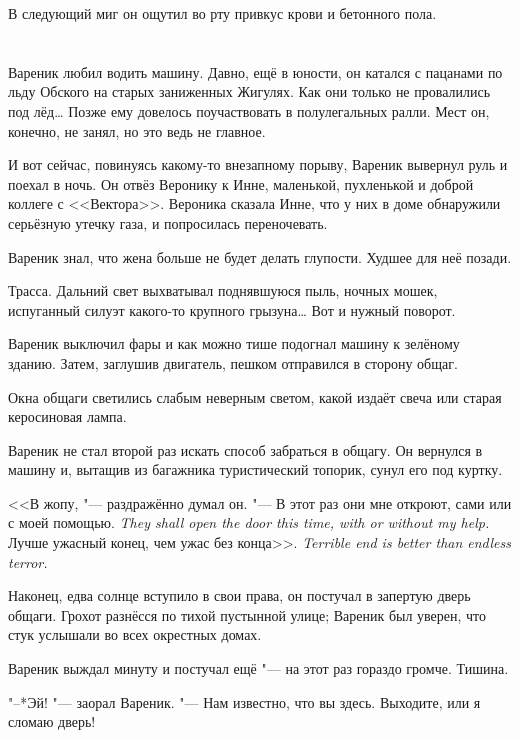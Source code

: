 В следующий миг он ощутил во рту привкус крови и бетонного пола.

\chapter{}

\label{Thu_2012_08_30}

Вареник любил водить машину.
Давно, ещё в юности, он катался с пацанами по льду Обского на старых заниженных Жигулях.
Как они только не провалились под лёд\ldots{}
Позже ему довелось поучаствовать в полулегальных ралли.
Мест он, конечно, не занял, но это ведь не главное.

И вот сейчас, повинуясь какому-то внезапному порыву, Вареник вывернул руль и поехал в ночь.
Он отвёз Веронику к Инне, маленькой, пухленькой и доброй коллеге с <<Вектора>>.
Вероника сказала Инне, что у них в доме обнаружили серьёзную утечку газа, и попросилась переночевать.

Вареник знал, что жена больше не будет делать глупости.
Худшее для неё позади.

Трасса.
Дальний свет выхватывал поднявшуюся пыль, ночных мошек, испуганный силуэт какого-то крупного грызуна\ldots{}
Вот и нужный поворот.

Вареник выключил фары и как можно тише подогнал машину к зелёному зданию.
Затем, заглушив двигатель, пешком отправился в сторону общаг.

Окна общаги светились слабым неверным светом, какой издаёт свеча или старая керосиновая лампа.

Вареник не стал второй раз искать способ забраться в общагу.
Он вернулся в машину и, вытащив из багажника туристический топорик, сунул его под куртку.

<<В жопу, "--- раздражённо думал он.
{"--- В этот раз они мне откроют, сами или с моей помощью.}
{\textit{They shall open the door this time, with or without my help.}}
{Лучше ужасный конец, чем ужас без конца>>.}
{\textit{Terrible end is better than endless terror.}}

Наконец, едва солнце вступило в свои права, он постучал в запертую дверь общаги.
Грохот разнёсся по тихой пустынной улице;
Вареник был уверен, что стук услышали во всех окрестных домах.

Вареник выждал минуту и постучал ещё "--- на этот раз гораздо громче.
Тишина.

"--*Эй! "--- заорал Вареник.
"--- Нам известно, что вы здесь.
Выходите, или я сломаю дверь!

